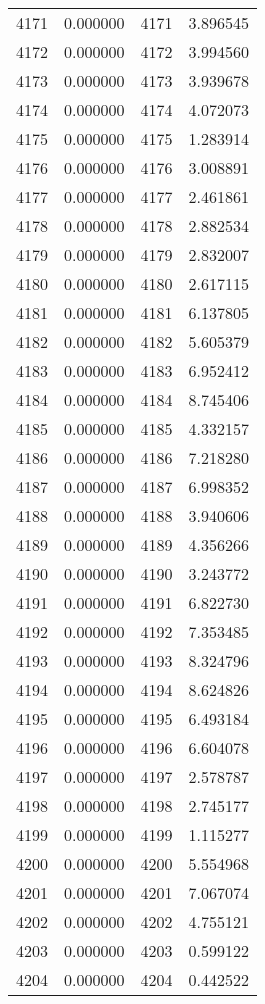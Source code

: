 \documentclass[12pt]{article}
\begin{document}
\begin{longtable}{@{}cccc@{}}
4171 & 0.000000 & 4171 & 3.896545 \\
4172 & 0.000000 & 4172 & 3.994560 \\
4173 & 0.000000 & 4173 & 3.939678 \\
4174 & 0.000000 & 4174 & 4.072073 \\
4175 & 0.000000 & 4175 & 1.283914 \\
4176 & 0.000000 & 4176 & 3.008891 \\
4177 & 0.000000 & 4177 & 2.461861 \\
4178 & 0.000000 & 4178 & 2.882534 \\
4179 & 0.000000 & 4179 & 2.832007 \\
4180 & 0.000000 & 4180 & 2.617115 \\
4181 & 0.000000 & 4181 & 6.137805 \\
4182 & 0.000000 & 4182 & 5.605379 \\
4183 & 0.000000 & 4183 & 6.952412 \\
4184 & 0.000000 & 4184 & 8.745406 \\
4185 & 0.000000 & 4185 & 4.332157 \\
4186 & 0.000000 & 4186 & 7.218280 \\
4187 & 0.000000 & 4187 & 6.998352 \\
4188 & 0.000000 & 4188 & 3.940606 \\
4189 & 0.000000 & 4189 & 4.356266 \\
4190 & 0.000000 & 4190 & 3.243772 \\
4191 & 0.000000 & 4191 & 6.822730 \\
4192 & 0.000000 & 4192 & 7.353485 \\
4193 & 0.000000 & 4193 & 8.324796 \\
4194 & 0.000000 & 4194 & 8.624826 \\
4195 & 0.000000 & 4195 & 6.493184 \\
4196 & 0.000000 & 4196 & 6.604078 \\
4197 & 0.000000 & 4197 & 2.578787 \\
4198 & 0.000000 & 4198 & 2.745177 \\
4199 & 0.000000 & 4199 & 1.115277 \\
4200 & 0.000000 & 4200 & 5.554968 \\
4201 & 0.000000 & 4201 & 7.067074 \\
4202 & 0.000000 & 4202 & 4.755121 \\
4203 & 0.000000 & 4203 & 0.599122 \\
4204 & 0.000000 & 4204 & 0.442522 \\

\end{longtable}
\end{document}
